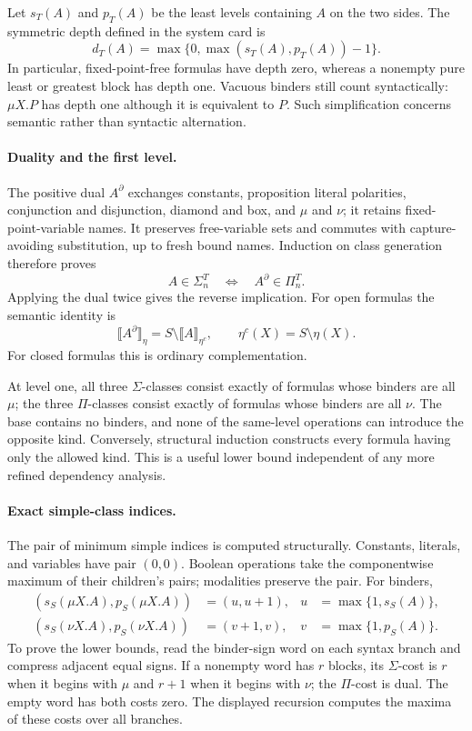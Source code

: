 Let \(s_T(A)\) and \(p_T(A)\)
be the least levels containing
\(A\) on the two sides.
The symmetric depth defined
in the system card is
\[
 d_T(A)=
   \max\{0,\max(s_T(A),p_T(A))-1\}.
\]
In particular, fixed-point-free
formulas have depth zero,
whereas a nonempty pure
least or greatest block
has depth one.
Vacuous binders still count
syntactically: \(\mu X.P\)
has depth one although it
is equivalent to \(P\).
Such simplification concerns
semantic rather than
syntactic alternation.

\paragraph{Duality and the first level.}
The positive dual \(A^\partial\)
exchanges constants, proposition
literal polarities, conjunction
and disjunction, diamond and
box, and \(\mu\) and \(\nu\);
it retains fixed-point-variable
names. It preserves free-variable
sets and commutes with
capture-avoiding substitution,
up to fresh bound names.
Induction on class generation
therefore proves
\[
 A\in\Sigma_n^T
 \quad\Longleftrightarrow\quad
 A^\partial\in\Pi_n^T.
\]
Applying the dual twice gives
the reverse implication.
For open formulas the
semantic identity is
\[
 \llbracket A^\partial\rrbracket_\eta
    =S\setminus\llbracket A\rrbracket_{\eta^c},
 \qquad \eta^c(X)=S\setminus\eta(X).
\]
For closed formulas this
is ordinary complementation.

At level one, all three
\(\Sigma\)-classes consist
exactly of formulas whose
binders are all \(\mu\);
the three \(\Pi\)-classes
consist exactly of formulas
whose binders are all \(\nu\).
The base contains no binders,
and none of the same-level
operations can introduce
the opposite kind.
Conversely, structural induction
constructs every formula
having only the allowed
kind. This is a useful
lower bound independent of
any more refined dependency
analysis.

\paragraph{Exact simple-class indices.}
The pair of minimum simple
indices is computed structurally.
Constants, literals, and
variables have pair \((0,0)\).
Boolean operations take the
componentwise maximum of
their children's pairs;
modalities preserve the pair.
For binders,
\[
\begin{aligned}
 (s_S(\mu X.A),p_S(\mu X.A))
     &=(u,u+1),&u&=\max\{1,s_S(A)\},\\
 (s_S(\nu X.A),p_S(\nu X.A))
     &=(v+1,v),&v&=\max\{1,p_S(A)\}.
\end{aligned}
\]
To prove the lower bounds,
read the binder-sign word
on each syntax branch and
compress adjacent equal
signs. If a nonempty word
has \(r\) blocks, its
\(\Sigma\)-cost is \(r\)
when it begins with \(\mu\)
and \(r+1\) when it begins
with \(\nu\); the
\(\Pi\)-cost is dual.
The empty word has both
costs zero.
The displayed recursion
computes the maxima of
these costs over all
branches.

